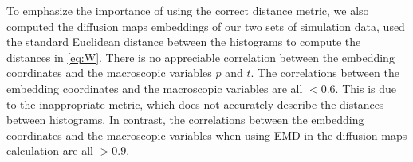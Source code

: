 \documentclass[prl, reprint, final, showkeys]{revtex4-1}
\begin{document}

To emphasize the importance of using the correct distance metric, we also computed the diffusion maps embeddings of our two sets of simulation data, used the standard Euclidean distance between the histograms to compute the distances in \eqref{eq:W}.
%
There is no appreciable correlation between the embedding coordinates and the macroscopic variables $p$ and $t$. 
%
The correlations between the embedding coordinates and the macroscopic variables are all $< 0.6$.
%
This is due to the inappropriate metric, which does not accurately describe the distances between histograms.
%
In contrast, the correlations between the embedding coordinates and the macroscopic variables when using EMD in the diffusion maps calculation are all $> 0.9$.


%
%
%
%

%
%
\end{document}

